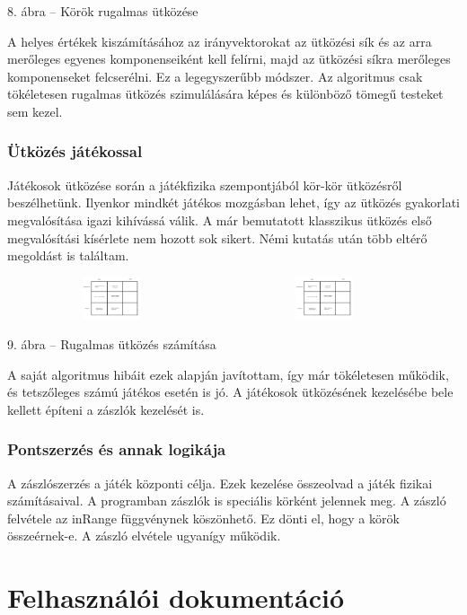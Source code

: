 \documentclass[]{article}
\begin{document}
8. ábra -- Körök rugalmas ütközése

A helyes értékek kiszámításához az irányvektorokat az ütközési sík és az
arra merőleges egyenes komponenseiként kell felírni, majd az ütközési
síkra merőleges komponenseket felcserélni. Ez a legegyszerűbb módszer.
Az algoritmus csak tökéletesen rugalmas ütközés szimulálására képes és
különböző tömegű testeket sem kezel.


\subsubsection{Ütközés
játékossal}

Játékosok ütközése során a játékfizika szempontjából kör-kör ütközésről
beszélhetünk. Ilyenkor mindkét játékos mozgásban lehet, így az ütközés
gyakorlati megvalósítása igazi kihívássá válik. A már bemutatott
klasszikus ütközés első megvalósítási kísérlete nem hozott sok sikert.
Némi kutatás után több eltérő megoldást is találtam.

\includegraphics[width=2.42083in,height=0.48611in]{media/image5.png}
\includegraphics[width=2.42083in,height=0.48611in]{media/image6.png}

9. ábra -- Rugalmas ütközés számítása

A saját algoritmus hibáit ezek alapján javítottam, így már tökéletesen
működik, és tetszőleges számú játékos esetén is jó. A játékosok
ütközésének kezelésébe bele kellett építeni a zászlók kezelését is.


\subsubsection{Pontszerzés és annak
logikája}

A zászlószerzés a játék központi célja. Ezek kezelése összeolvad a játék
fizikai számításaival. A programban zászlók is speciális körként
jelennek meg. A zászló felvétele az inRange függvénynek köszönhető. Ez
dönti el, hogy a körök összeérnek-e. A zászló elvétele ugyanígy működik.


\section{Felhasználói
dokumentáció}
\end{document}
